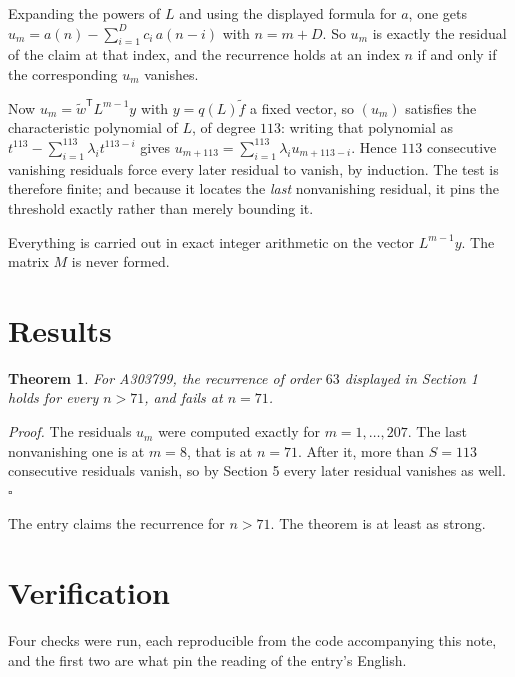 \documentclass[11pt]{article}
\newtheorem{theorem}{Theorem}
\theoremstyle{definition}
\begin{document}
Expanding the powers of $L$ and using the displayed formula for $a$, one gets $u_m = a(n) - \sum_{i=1}^{D} c_i\,a(n-i)$ with $n = m + D$. So $u_m$ is exactly the residual of the claim at that index, and the recurrence holds at an index $n$ if and only if the corresponding $u_m$ vanishes.

Now $u_m = \tilde w^{\mathsf T} L^{m-1} y$ with $y = q(L)\tilde f$ a fixed vector, so $(u_m)$ satisfies the characteristic polynomial of $L$, of degree $113$: writing that polynomial as $t^{113} - \sum_{i=1}^{113} \lambda_i t^{113-i}$ gives $u_{m+113} = \sum_{i=1}^{113} \lambda_i u_{m+113-i}$. Hence $113$ consecutive vanishing residuals force every later residual to vanish, by induction. The test is therefore finite; and because it locates the {\itshape last} nonvanishing residual, it pins the threshold exactly rather than merely bounding it.

Everything is carried out in exact integer arithmetic on the vector $L^{m-1}y$. The matrix $M$ is never formed.

\section{Results}

\begin{theorem} For A303799, the recurrence of order $63$ displayed in Section 1 holds for every $n > 71$, and fails at $n = 71$.\end{theorem}

{\itshape Proof.} The residuals $u_m$ were computed exactly for $m = 1,\dots,207$. The last nonvanishing one is at $m = 8$, that is at $n = 71$. After it, more than $S = 113$ consecutive residuals vanish, so by Section 5 every later residual vanishes as well. $\square$

The entry claims the recurrence for $n > 71$. The theorem is at least as strong.

\section{Verification}

Four checks were run, each reproducible from the code accompanying this note, and the first two are what pin the reading of the entry's English.
\end{document}
